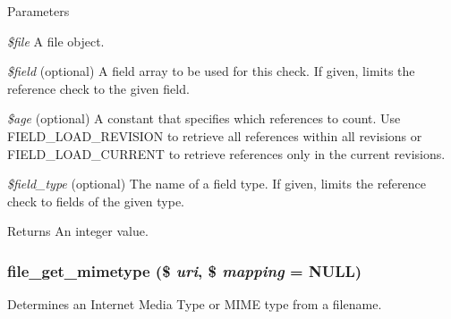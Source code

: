 \begin{DoxyParams}{Parameters}
\item[{\em \$file}]A file object. \item[{\em \$field}](optional) A field array to be used for this check. If given, limits the reference check to the given field. \item[{\em \$age}](optional) A constant that specifies which references to count. Use FIELD\_\-LOAD\_\-REVISION to retrieve all references within all revisions or FIELD\_\-LOAD\_\-CURRENT to retrieve references only in the current revisions. \item[{\em \$field\_\-type}](optional) The name of a field type. If given, limits the reference check to fields of the given type.\end{DoxyParams}
\begin{DoxyReturn}{Returns}
An integer value. 
\end{DoxyReturn}
\hypertarget{group__file_ga2f3c500f59ecd606e4022ed9d83a1dec}{
\subsubsection[{file\_\-get\_\-mimetype}]{\setlength{\rightskip}{0pt plus 5cm}file\_\-get\_\-mimetype (\$ {\em uri}, \/  \$ {\em mapping} = {\ttfamily NULL})}}
\label{group__file_ga2f3c500f59ecd606e4022ed9d83a1dec}
Determines an Internet Media Type or MIME type from a filename.



